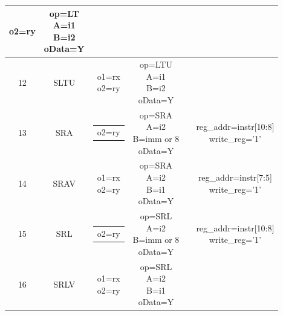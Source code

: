 \documentclass[10pt]{article}
\makeatletter
\newcommand{\zcell}[2]{\begin{tabular}{@{}#1@{}}#2\end{tabular}}
\makeatother
\begin{document}
\begin{CJK}{UTF8}{gbsn}
\begin{center}
\begin{longtable}{|c|c|c|c|c|c|}
{				o2=ry}            &\zcell{c}{op=LT\\ 
								   A=i1\\B=i2\\
								   oData=Y}           &                         &    \\\hline
12 & SLTU      &\zcell{c}{o1=rx\\                                                            
				o2=ry}            &\zcell{c}{op=LTU\\
								   A=i1\\B=i2\\
								   oData=Y}           &                         &    \\\hline
13 & SRA       &\zcell{c}{o2=ry}  &\zcell{c}{op=SRA\\
								   A=i2\\B=imm or 8\\
								   oData=Y}           &                         &\zcell{c}{
																				 reg\_addr=instr[10:8]\\
														                         write\_reg='1'}\\\hline
14 & SRAV      &\zcell{c}{o1=rx\\                                                            
                o2=ry}            &\zcell{c}{op=SRA\\
								   A=i2\\B=i1\\
								   oData=Y}           &                         &\zcell{c}{
																				 reg\_addr=instr[7:5]\\
														                         write\_reg='1'}\\\hline
15 & SRL       &\zcell{c}{o2=ry}  &\zcell{c}{op=SRL\\
								   A=i2\\B=imm or 8\\
								   oData=Y}           &                         &\zcell{c}{
																				 reg\_addr=instr[10:8]\\
														                         write\_reg='1'}\\\hline
16 & SRLV      &\zcell{c}{o1=rx\\                                                            
                o2=ry}            &\zcell{c}{op=SRL\\
								   A=i2\\B=i1\\
								   oData=Y}           &                         &\zcell{c}{
}
\end{longtable}
\end{center}
\end{CJK}
\end{document}
